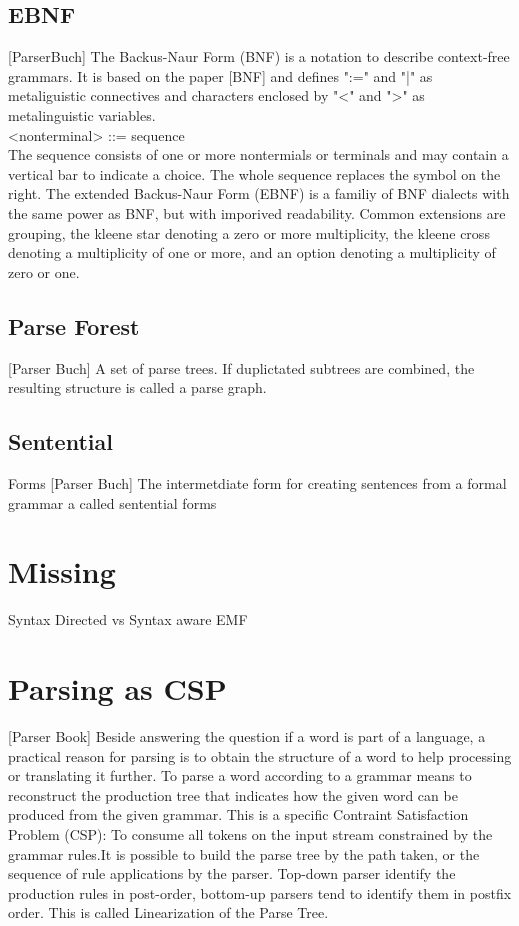 \subsection{EBNF} [ParserBuch]
The Backus-Naur Form (BNF) is a notation to describe context-free grammars. It is based on the paper [BNF] and defines ":=" and "|" as metaliguistic connectives and characters enclosed by "<" and ">" as metalinguistic variables.\\
 <nonterminal> ::= sequence\\
The sequence consists of one or more nontermials or terminals and may contain a vertical bar to indicate a choice. The whole sequence replaces the symbol on the right. The extended Backus-Naur Form (EBNF) is a familiy of BNF dialects with the same power as BNF, but with imporived readability. Common extensions are grouping, the kleene star denoting a zero or more multiplicity, the kleene cross denoting a multiplicity of one or more, and an option denoting a multiplicity of zero or one. 

\subsection{Parse Forest} [Parser Buch]
A set of parse trees. If duplictated subtrees are combined, the resulting structure is called a parse graph.

\subsection{Sentential}  Forms [Parser Buch]
The intermetdiate form for creating sentences from a formal grammar a called sentential forms



\section{Missing}
Syntax Directed vs Syntax aware
EMF

\section{Parsing as CSP } [Parser Book]
Beside answering the question if a word is part of a language, a practical reason for parsing is to obtain the structure of a word to help processing or translating it further. To parse a word according to a grammar means to reconstruct the production tree that indicates how the given word can be produced from the given grammar. This is a specific Contraint Satisfaction Problem (CSP): To consume all tokens on the input stream constrained by the grammar rules.It is possible to build the parse tree by the path taken, or the sequence of rule applications by the parser.  Top-down parser identify the production rules in post-order, bottom-up parsers tend to identify them in postfix order. This is called Linearization of the Parse Tree.
